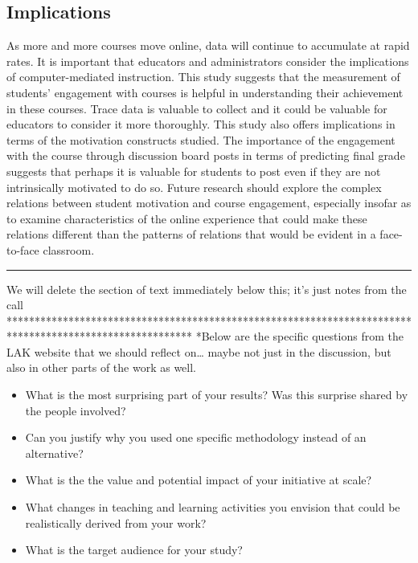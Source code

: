 \documentclass[acmart]{apa6}
\theoremstyle{definition}
\theoremstyle{definition}
\theoremstyle{definition}
\theoremstyle{remark}
\begin{document}
\subsection{Implications}\label{implications}

As more and more courses move online, data will continue to accumulate
at rapid rates. It is important that educators and administrators
consider the implications of computer-mediated instruction. This study
suggests that the measurement of students' engagement with courses is
helpful in understanding their achievement in these courses. Trace data
is valuable to collect and it could be valuable for educators to
consider it more thoroughly. This study also offers implications in
terms of the motivation constructs studied. The importance of the
engagement with the course through discussion board posts in terms of
predicting final grade suggests that perhaps it is valuable for students
to post even if they are not intrinsically motivated to do so. Future
research should explore the complex relations between student motivation
and course engagement, especially insofar as to examine characteristics
of the online experience that could make these relations different than
the patterns of relations that would be evident in a face-to-face
classroom.

\begin{center}\rule{0.5\linewidth}{\linethickness}\end{center}

We will delete the section of text immediately below this; it's just
notes from the call
*********************************************************************************************************
*Below are the specific questions from the LAK website that we should
reflect on\ldots{} maybe not just in the discussion, but also in other
parts of the work as well.

\begin{itemize}
\item
  What is the most surprising part of your results? Was this surprise
  shared by the people involved?
\item
  Can you justify why you used one specific methodology instead of an
  alternative?
\item
  What is the the value and potential impact of your initiative at
  scale?
\item
  What changes in teaching and learning activities you envision that
  could be realistically derived from your work?
\item
  What is the target audience for your study?
\end{itemize}
\end{document}
